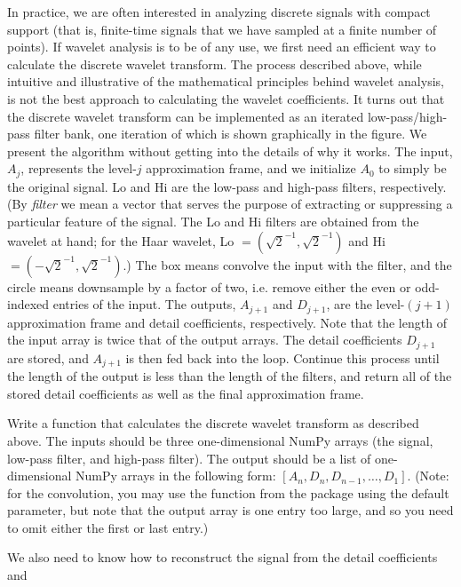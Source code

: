 In practice, we are often interested in analyzing discrete signals with compact support (that is,
finite-time signals that we have sampled at a finite number of points). If wavelet analysis is
to be of any use, we first need an efficient way to calculate the discrete wavelet transform.
The process described above, while intuitive and illustrative of the mathematical principles
behind wavelet analysis, is not the best approach to calculating the wavelet coefficients. It 
turns out that the discrete wavelet transform can be implemented as an iterated low-pass/high-
pass filter bank, one iteration of which is shown graphically in the figure. We present the 
algorithm without getting into the details of why it works.
The input, $A_j$, represents the level-$j$ approximation frame, and we initialize $A_0$ to 
simply be the original signal. Lo and Hi are the low-pass and high-pass filters, respectively. 
(By \emph{filter} we mean a vector that serves the purpose of extracting or suppressing a 
particular feature of the signal. The Lo and Hi filters are obtained from the wavelet at hand; 
for the Haar wavelet, Lo $= (\sqrt{2}^{-1}, \sqrt{2}^{-1})$ and Hi $= (-\sqrt{2}^{-1}, \sqrt{2}
^{-1})$.) The box means convolve the input with the filter, and the circle means downsample by
a factor of two, i.e. remove either the even or odd-indexed entries of the input. The outputs, 
$A_{j+1}$ and $D_{j+1}$, are the level-$(j+1)$ approximation frame and detail coefficients, 
respectively. Note that the length of the input array is twice that of the output arrays. The
detail coefficients $D_{j+1}$ are stored, and $A_{j+1}$ is then fed back into the loop. Continue
this process until the length of the output is less than the length of the filters, and 
return all of the stored detail coefficients as well as the final approximation frame. 
\begin{problem}
Write a function that calculates the discrete wavelet transform as described above.
The inputs should be three one-dimensional NumPy arrays (the signal, low-pass filter, and
high-pass filter). The output should be a list of one-dimensional NumPy arrays in the 
following form: $[A_n, D_n, D_{n-1},\ldots,D_1]$. (Note: for the convolution, you may use 
the  function from the  package using the default 
 parameter, but note that the output array is one entry too large, and so
you need to omit either the first or last entry.) 
\end{problem}
We also need to know how to reconstruct the signal from the detail coefficients and 

